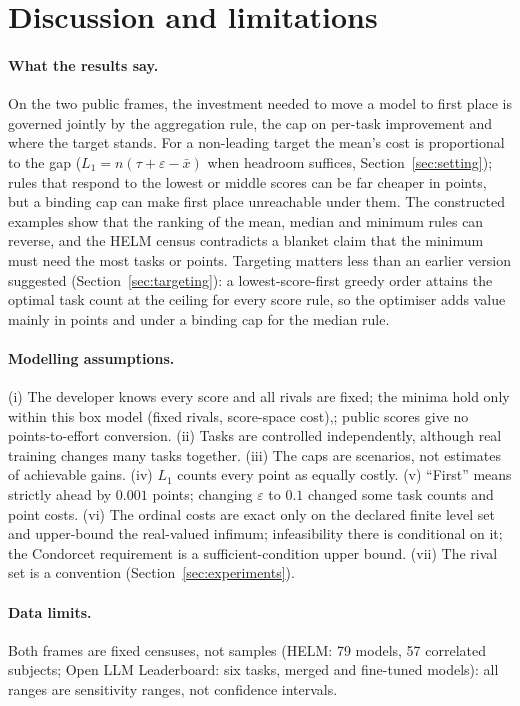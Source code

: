\section{Discussion and limitations}
\label{sec:limits}
\paragraph{What the results say.}
On the two public frames, the investment needed to move a model to first place is governed jointly by the aggregation rule, the cap on per-task improvement and where the target stands. For a non-leading target the mean's cost is proportional to the gap ($L_1=n(\tau+\varepsilon-\bar x)$ when headroom suffices, Section~\ref{sec:setting}); rules that respond to the lowest or middle scores can be far cheaper in points, but a binding cap can make first place unreachable under them. The constructed examples show that the ranking of the mean, median and minimum rules can reverse, and the HELM census contradicts a blanket claim that the minimum must need the most tasks or points. Targeting matters less than an earlier version suggested (Section~\ref{sec:targeting}): a lowest-score-first greedy order attains the optimal task count at the ceiling for every score rule, so the optimiser adds value mainly in points and under a binding cap for the median rule.

\paragraph{Modelling assumptions.}
(i) The developer knows every score and all rivals are fixed; the minima hold only within this box model (fixed rivals, score-space cost),; public scores give no points-to-effort conversion. (ii) Tasks are controlled independently, although real training changes many tasks together. (iii) The caps are scenarios, not estimates of achievable gains. (iv) $L_1$ counts every point as equally costly. (v) ``First'' means strictly ahead by $0.001$ points; changing $\varepsilon$ to $0.1$ changed some task counts and point costs. (vi) The ordinal costs are exact only on the declared finite level set and upper-bound the real-valued infimum; infeasibility there is conditional on it; the Condorcet requirement is a sufficient-condition upper bound. (vii) The rival set is a convention (Section~\ref{sec:experiments}).

\paragraph{Data limits.}
Both frames are fixed censuses, not samples (HELM: 79 models, 57 correlated subjects; Open LLM Leaderboard: six tasks, merged and fine-tuned models): all ranges are sensitivity ranges, not confidence intervals.

